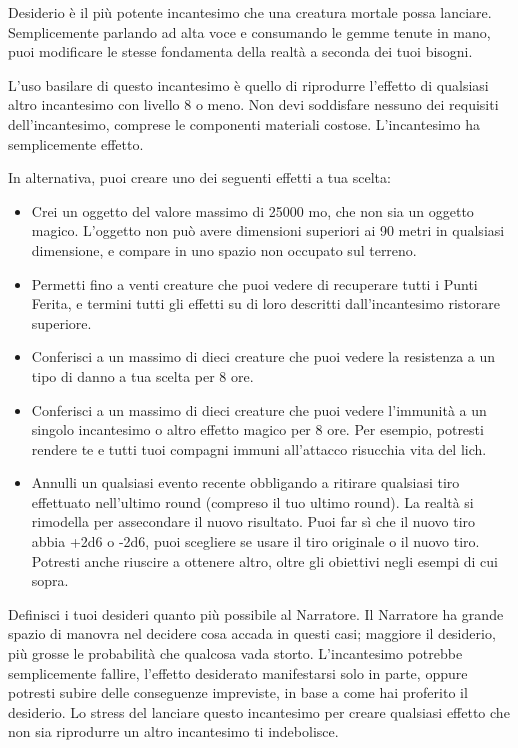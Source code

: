 \begin{multicols}{2}
Desiderio è il più potente incantesimo che una creatura mortale possa lanciare. Semplicemente parlando ad alta voce e consumando le gemme tenute in mano, puoi modificare le stesse fondamenta della realtà a seconda dei tuoi bisogni.

L'uso basilare di questo incantesimo è quello di riprodurre l'effetto di qualsiasi altro incantesimo con livello 8 o meno. Non devi soddisfare nessuno dei requisiti dell'incantesimo, comprese le componenti materiali costose. L'incantesimo ha semplicemente effetto.

In alternativa, puoi creare uno dei seguenti effetti a tua scelta:

\begin{itemize}[leftmargin=*] \setlength{\itemsep}{0pt}
	\item Crei un oggetto del valore massimo di 25000 mo, che non sia un oggetto magico. L'oggetto non può avere dimensioni superiori ai 90 metri in qualsiasi dimensione, e compare in uno spazio non occupato sul terreno.
	\item Permetti fino a venti creature che puoi vedere di recuperare tutti i Punti Ferita, e termini tutti gli effetti su di loro descritti dall'incantesimo ristorare superiore.
	\item Conferisci a un massimo di dieci creature che puoi vedere la resistenza a un tipo di danno a tua scelta per 8 ore.
	\item Conferisci a un massimo di dieci creature che puoi vedere l'immunità a un singolo incantesimo o altro effetto magico per 8 ore. Per esempio, potresti rendere te e tutti tuoi compagni immuni all'attacco risucchia vita del lich.
	\item Annulli un qualsiasi evento recente obbligando a ritirare qualsiasi tiro effettuato nell'ultimo round (compreso il tuo ultimo round). La realtà si rimodella per assecondare il nuovo risultato. Puoi far sì che il nuovo tiro abbia +2d6 o -2d6, puoi scegliere se usare il tiro originale o il nuovo tiro. Potresti anche riuscire a ottenere altro, oltre gli obiettivi negli esempi di cui sopra.
\end{itemize}

\medskip
Definisci i tuoi desideri quanto più possibile al Narratore. Il Narratore ha grande spazio di manovra nel decidere cosa accada in questi casi; maggiore il desiderio, più grosse le probabilità che qualcosa vada storto. L'incantesimo potrebbe semplicemente fallire, l'effetto desiderato manifestarsi solo in parte, oppure potresti subire delle conseguenze impreviste, in base a come hai proferito il desiderio. Lo stress del lanciare questo incantesimo per creare qualsiasi effetto che non sia riprodurre un altro incantesimo ti indebolisce.


\end{multicols}
